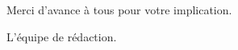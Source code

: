 

Merci d'avance à tous pour votre implication.

\vspace{18pt}

L'équipe de rédaction.

\vspace{2cm}


  

